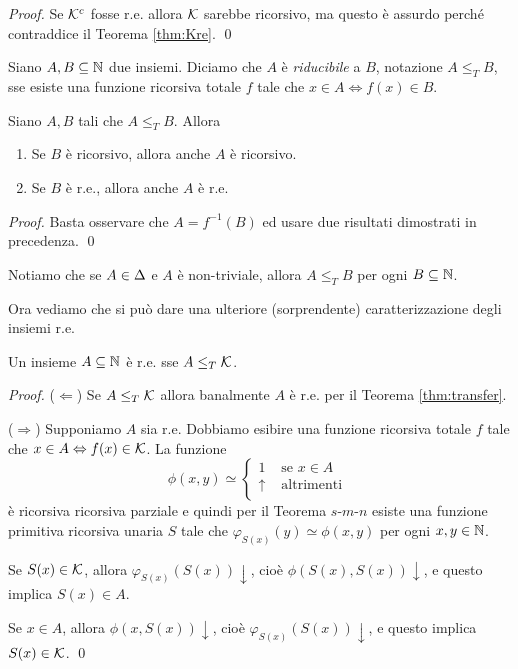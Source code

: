\documentclass[runningheads,a4paper]{llncs}
\begin{document}
\begin{proof}
Se $\mathcal{K}^c$ fosse r.e. allora $\mathcal{K}$ sarebbe ricorsivo, ma questo \`{e} assurdo perch\'{e} contraddice il Teorema \ref{thm:Kre}.
\qed\end{proof}

\begin{definition}[Riducibilit\`{a}]
Siano $A,B \subseteq \mathbb{N}$ due insiemi. Diciamo che $A$ \`{e} \emph{riducibile} a $B$, notazione $A \leq_T B$, sse esiste una
 funzione ricorsiva totale $f$ tale che $x \in A \iff f(x) \in B$.
\end{definition}

\begin{theorem}\label{thm:transfer}
Siano $A,B$ tali che $A \leq_T B$. Allora
\begin{enumerate}[label=(\roman*)]
\item Se $B$ \`{e} ricorsivo, allora anche $A$ \`{e} ricorsivo.
\item Se $B$ \`{e} r.e., allora anche $A$ \`{e} r.e.
\end{enumerate}
\end{theorem}

\begin{proof}
Basta osservare che $A = f^{-1}(B)$ ed usare due risultati dimostrati in precedenza.
\qed\end{proof}

Notiamo che se $A \in \Delta$ e $A$ \`{e} non-triviale, allora $A\leq_T B$ per ogni $B \subseteq \mathbb{N}$.

Ora vediamo che si pu\`{o} dare una ulteriore (sorprendente) caratterizzazione degli insiemi r.e.

\begin{theorem}\label{thm:all-reduce}
Un insieme $A\subseteq \mathbb{N}$ \`{e} r.e. sse $A \leq_T \mathcal{K}$.
\end{theorem}

\begin{proof}
\noindent($\Leftarrow$) Se $A \leq_T \mathcal{K}$ allora banalmente $A$ \`{e} r.e. per il Teorema \ref{thm:transfer}.

\noindent($\Rightarrow$) Supponiamo $A$ sia r.e. Dobbiamo esibire una funzione ricorsiva totale $f$ tale che $x \in A \Leftrightarrow f(x) \in \mathcal{K}$.
 La funzione
$$
\phi(x,y) \simeq
\begin{cases}
1            & \mbox{ se $x \in A$} \\
\uparrow     & \mbox{ altrimenti } \\
\end{cases}
$$
\`{e} ricorsiva ricorsiva parziale e quindi per il Teorema $s$-$m$-$n$ esiste una funzione primitiva ricorsiva unaria $S$ tale che 
 $\varphi_{S(x)}(y) \simeq \phi(x,y)$ per ogni $x,y\in \mathbb{N}$.

Se $S(x) \in \mathcal{K}$, allora $\varphi_{S(x)}(S(x))\downarrow$, cio\`{e} $\phi(S(x),S(x))\downarrow$, e questo implica $S(x) \in A$.

Se $x \in A$, allora $\phi(x,S(x))\downarrow$, cio\`{e} $\varphi_{S(x)}(S(x))\downarrow$, e questo implica $S(x) \in \mathcal{K}$.
\qed\end{proof}
\end{document}
